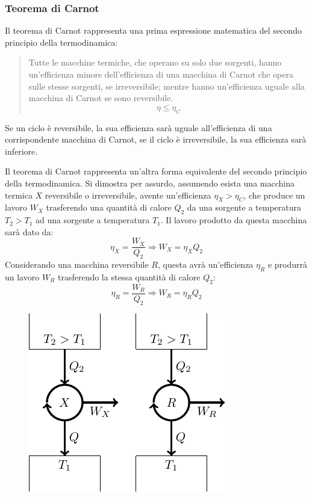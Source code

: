 \documentclass{article}
\numberwithin{equation}{subsection}
\begin{document}
\subsubsection{Teorema di Carnot}
Il teorema di Carnot rappresenta una prima espressione matematica del secondo principio della termodinamica: 
\begin{quotation}
    Tutte le macchine termiche, che operano su solo due sorgenti, hanno un'efficienza minore dell'efficienza di una macchina di Carnot che opera sulle stesse sorgenti, 
    se irreversibile; mentre hanno un'efficienza uguale alla macchina di Carnot se sono reversibile. 
    \begin{equation}
        \eta\leq\eta_C
    \end{equation}
\end{quotation}
Se un ciclo è reversibile, la sua efficienza sarà uguale all'efficienza di una corrispondente macchina di Carnot, 
se il ciclo è irreversibile, la sua efficienza sarà inferiore. 


Il teorema di Carnot rappresenta un'altra forma equivalente del secondo principio della termodinamica. Si dimostra per assurdo, assumendo esista una macchina termica $X$ 
reversibile o irreversibile, avente un'efficienza $\eta_X>\eta_C$, che produce 
un lavoro $W_X$ trasferendo una quantità di calore $Q_2$ da una sorgente a temperatura $T_2>T_1$ ad una sorgente a temperatura $T_1$. 
Il lavoro prodotto da questa macchina sarà dato da: 
\begin{equation*}
    \eta_X=\displaystyle\frac{W_X}{Q_2}\Rightarrow W_X=\eta_XQ_2
\end{equation*}
Considerando una macchina reversibile $R$, questa avrà un'efficienza $\eta_R$ e produrrà un lavoro $W_R$ trasferendo la stessa quantità di calore $Q_2$: 
\begin{equation*}
    \eta_R=\displaystyle\frac{W_R}{Q_2}\Rightarrow W_R=\eta_RQ_2
\end{equation*}

\begin{figure}[H]%
    \centering
    \includegraphics{carnot-2.pdf}%
\end{figure}
\end{document}
